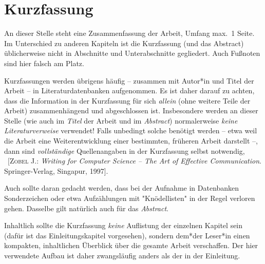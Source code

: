 \chapter{Kurzfassung}

An dieser Stelle steht eine Zusammenfassung der Arbeit, Umfang max.\ 1 Seite.
Im Unterschied zu anderen Kapiteln ist die Kurzfassung (und das Abstract)
üblicherweise nicht in Abschnitte und Unterabschnitte gegliedert. Auch
Fußnoten sind hier falsch am Platz.

Kurzfassungen werden übrigens häufig -- zusammen mit Autor*in und Titel der
Arbeit -- in Literaturdatenbanken aufgenommen. Es ist daher darauf zu achten,
dass die Information in der Kurzfassung für sich \emph{allein} (\dah ohne
weitere Teile der Arbeit) zusammenhängend und abgeschlossen ist. Insbesondere
werden an dieser Stelle (wie \ua auch im \emph{Titel} der Arbeit und im
\emph{Abstract}) normalerweise \emph{keine Literaturverweise} verwendet!
Falls unbedingt solche benötigt werden -- etwa weil die Arbeit eine
Weiterentwicklung einer bestimmten, früheren Arbeit darstellt --, dann sind
\emph{vollständige} Quellenangaben in der Kurzfassung selbst notwendig, \zB\
[\textsc{Zobel} J.: \textit{Writing for Computer Science -- The Art of
Effective Commu\-nica\-tion}. Springer-Verlag, Singa\-pur, 1997].

Auch sollte daran gedacht werden, dass bei der Aufnahme in Datenbanken
Sonderzeichen oder etwa Aufzählungen mit "Knödellisten" in der Regel verloren
gehen. Dasselbe gilt natürlich auch für das \emph{Abstract}.

Inhaltlich sollte die Kurzfassung \emph{keine} Auflistung der einzelnen
Kapitel sein (dafür ist das Einleitungskapitel vorgesehen), sondern dem*der
Leser*in einen kompakten, inhaltlichen Überblick über die gesamte Arbeit
verschaffen. Der hier verwendete Aufbau ist daher zwangsläufig anders als der
in der Einleitung.
